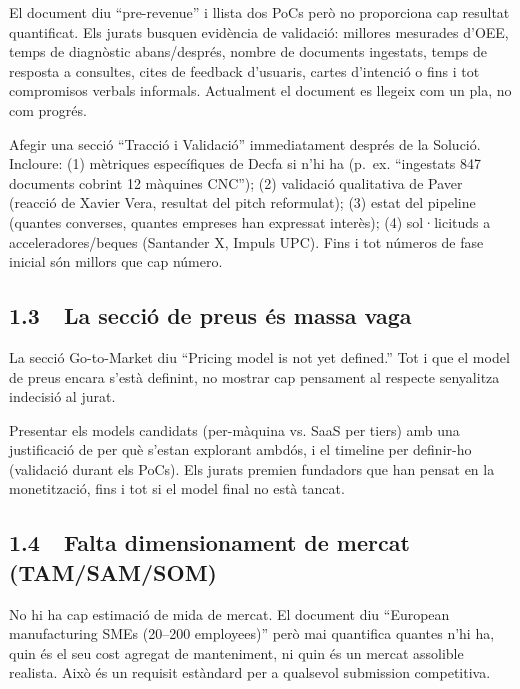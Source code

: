 \documentclass[11pt,a4paper]{article}
\begin{document}
\begin{issuebox}
El document diu ``pre-revenue'' i llista dos PoCs però no proporciona cap resultat quantificat. Els jurats busquen evidència de validació: millores mesurades d'OEE, temps de diagnòstic abans/després, nombre de documents ingestats, temps de resposta a consultes, cites de feedback d'usuaris, cartes d'intenció o fins i tot compromisos verbals informals. Actualment el document es llegeix com un pla, no com progrés.
\end{issuebox}

\begin{fixbox}
Afegir una secció ``Tracció i Validació'' immediatament després de la Solució. Incloure: (1) mètriques específiques de Decfa si n'hi ha (p.~ex. ``ingestats 847 documents cobrint 12 màquines CNC''); (2) validació qualitativa de Paver (reacció de Xavier Vera, resultat del pitch reformulat); (3) estat del pipeline (quantes converses, quantes empreses han expressat interès); (4) sol·licituds a acceleradores/beques (Santander X, Impuls UPC). Fins i tot números de fase inicial són millors que cap número.
\end{fixbox}

\subsection{1.3~~La secció de preus és massa vaga}

\begin{issuebox}
La secció Go-to-Market diu ``Pricing model is not yet defined.'' Tot i que el model de preus encara s'està definint, no mostrar cap pensament al respecte senyalitza indecisió al jurat.
\end{issuebox}

\begin{fixbox}
Presentar els models candidats (per-màquina vs. SaaS per tiers) amb una justificació de per què s'estan explorant ambdós, i el timeline per definir-ho (validació durant els PoCs). Els jurats premien fundadors que han pensat en la monetització, fins i tot si el model final no està tancat.
\end{fixbox}

\subsection{1.4~~Falta dimensionament de mercat (TAM/SAM/SOM)}

\begin{issuebox}
No hi ha cap estimació de mida de mercat. El document diu ``European manufacturing SMEs (20--200 employees)'' però mai quantifica quantes n'hi ha, quin és el seu cost agregat de manteniment, ni quin és un mercat assolible realista. Això és un requisit estàndard per a qualsevol submission competitiva.
\end{issuebox}
\end{document}
